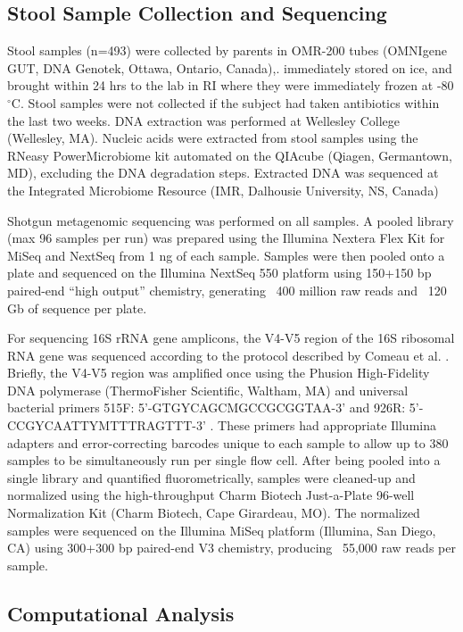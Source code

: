 \documentclass[fleqn,10pt]{wlscirep}
\begin{document}
\subsection*{Stool Sample Collection and Sequencing}

Stool samples (n=493) were collected by parents in OMR-200 tubes (OMNIgene GUT, DNA Genotek, Ottawa, Ontario, Canada),.
immediately stored on ice, and brought within 24 hrs to the lab in RI where they were immediately frozen at -80$^{\circ}$C.
Stool samples were not collected if the subject had taken antibiotics within the last two weeks.
DNA extraction was performed at Wellesley College (Wellesley, MA).
Nucleic acids were extracted from stool samples using the RNeasy PowerMicrobiome kit
automated on the QIAcube (Qiagen, Germantown, MD), excluding the DNA degradation steps.
Extracted DNA was sequenced at the Integrated Microbiome Resource (IMR, Dalhousie University, NS, Canada)

Shotgun metagenomic sequencing was performed on all samples.
A pooled library (max 96 samples per run) was prepared using the Illumina Nextera Flex Kit for MiSeq and NextSeq from 1 ng of each sample.
Samples were then pooled onto a plate and sequenced
on the Illumina NextSeq 550 platform using 150+150 bp paired-end “high output” chemistry,
generating ~400 million raw reads and ~120 Gb of sequence per plate.

For sequencing 16S rRNA gene amplicons,
the V4-V5 region of the 16S ribosomal RNA gene was sequenced according to the protocol
described by Comeau et al. \cite{Comeau2017-jg}.
Briefly, the V4-V5 region was amplified once using the Phusion High-Fidelity DNA polymerase
(ThermoFisher Scientific, Waltham, MA) and universal bacterial primers
515F: 5’-GTGYCAGCMGCCGCGGTAA-3’ and 926R: 5’-CCGYCAATTYMTTTRAGTTT-3’ \cite{Parada2016-uz,Walters2016-fi}.
These primers had appropriate Illumina adapters and error-correcting barcodes unique to each sample
to allow up to 380 samples to be simultaneously run per single flow cell.
After being pooled into a single library and quantified fluorometrically,
samples were cleaned-up and normalized using the high-throughput Charm Biotech Just-a-Plate 96-well Normalization Kit (Charm Biotech, Cape Girardeau, MO).
The normalized samples were sequenced on the Illumina MiSeq platform (Illumina, San Diego, CA)
using 300+300 bp paired-end V3 chemistry, producing ~55,000 raw reads per sample.

\subsection*{Computational Analysis}
\end{document}
